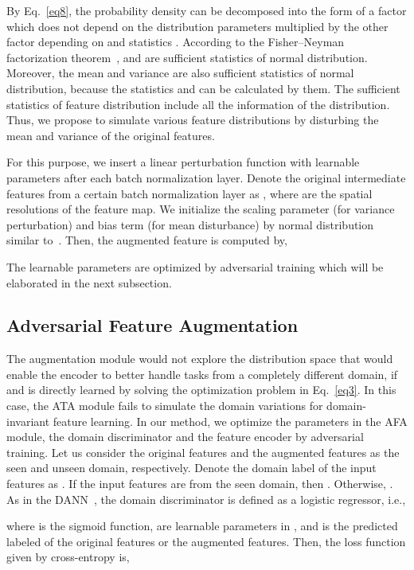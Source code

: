 \documentclass[runningheads]{utils/llncs}
\begin{document}
By Eq.~\eqref{eq8}, the probability density  can be decomposed into the form of a factor which does not depend on the distribution parameters  multiplied by the other factor depending on  and statistics .
According to the Fisher–Neyman factorization theorem~\cite{fisher1922mathematical,splawa1990application},  and  are sufficient statistics of normal distribution.
Moreover, the mean and variance are also sufficient statistics of normal distribution, because the statistics  and  can be calculated by them. 
The sufficient statistics of feature distribution include all the information of the distribution.
Thus, we propose to simulate various feature distributions by disturbing the mean and variance of the original features.


For this purpose, we insert a linear perturbation function with learnable parameters after each batch normalization layer.
Denote the original intermediate features from a certain batch normalization layer as , where  are the spatial resolutions of the feature map.
We initialize the scaling parameter  (for variance perturbation) and bias term  (for mean disturbance) by normal distribution similar to~\cite{TsengLH020}. 
Then, the augmented feature  is computed by, 

The learnable parameters  are optimized by adversarial training which will be elaborated in the next subsection.




\subsection{Adversarial Feature Augmentation}
The augmentation module would not explore the distribution space that would enable the encoder to better handle tasks from a completely different domain, if  and  is directly learned by solving the optimization problem in Eq.~\eqref{eq3}.
In this case, the ATA module fails to simulate the domain variations for domain-invariant feature learning.
In our method, we optimize the parameters in the AFA module, the domain discriminator  and the feature encoder  by adversarial training.
Let us consider the original features  and the augmented features  as the seen and unseen domain, respectively.
Denote the domain label of the input features as .
If the input features are from the seen domain, then . Otherwise, . 
As in the DANN~\cite{GaninUAGLLML17}, the domain discriminator  is defined as a logistic regressor, i.e.,

where  is the sigmoid function,  are learnable parameters in , and  is the predicted labeled of the original features or the augmented features. 
Then, the loss function given by cross-entropy is,
\end{document}
